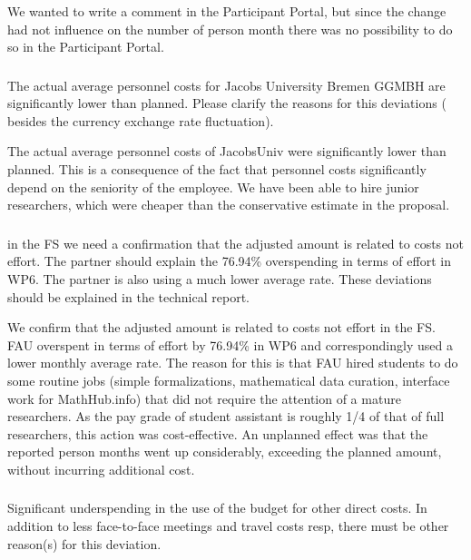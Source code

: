 \begin{itemize}
We wanted to write a comment in the Participant Portal, but since the change had not influence on the number of person month there was no possibility to do so in the Participant Portal.

\subsubsection{}

\begin{EUcomment}
  The actual average personnel costs for Jacobs University Bremen GGMBH are significantly lower than planned. Please
  clarify the reasons for this deviations ( besides the currency exchange rate fluctuation).
\end{EUcomment}

The actual average personnel costs of JacobsUniv were significantly
lower than planned. This is a consequence of the fact that personnel
costs significantly depend on the seniority of the employee. We have
been able to hire junior researchers, which were cheaper than the
conservative estimate in the proposal.

\subsubsection{}

\begin{EUcomment}
in the FS we need a confirmation that the adjusted amount is related to costs not effort. 
The partner should explain the 76.94\% overspending in terms of effort in WP6. The partner is
also using a much lower average rate. These deviations should be explained in the technical report.
\end{EUcomment}

We confirm that the adjusted amount is related to costs not effort in the FS.
FAU overspent in terms of effort by 76.94\% in WP6 and correspondingly used a lower monthly
average rate. The reason for this is that FAU hired students to do some routine jobs
(simple formalizations, mathematical data curation, interface work for MathHub.info) that
did not require the attention of a mature researchers. As the pay grade of student
assistant is roughly 1/4 of that of full researchers, this action was cost-effective. An
unplanned effect was that the reported person months went up considerably, exceeding the
planned amount, without incurring additional cost.


\subsubsection{}
\begin{EUcomment}
  Significant underspending in the use of the budget for other direct
  costs. In addition to less face-to-face meetings and travel costs
  resp, there must be other reason(s) for this deviation.
\end{EUcomment}


\end{itemize}
